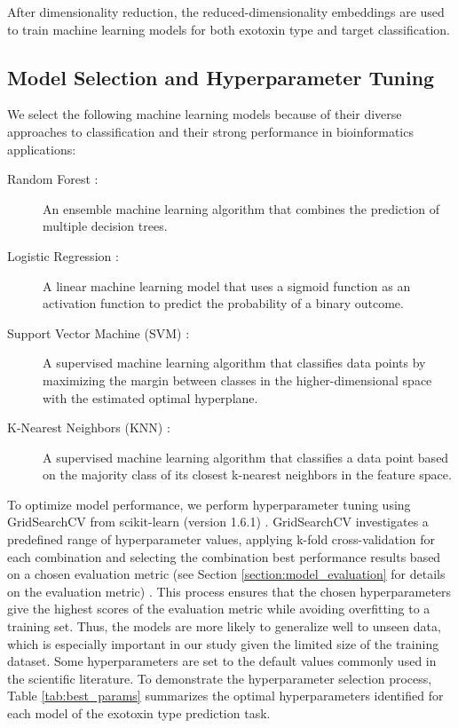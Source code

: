 After dimensionality reduction, the reduced-dimensionality embeddings are used to train machine learning models for both exotoxin type and target classification.

\subsection{Model Selection and Hyperparameter Tuning}
We select the following machine learning models because of their diverse approaches to classification and their strong performance in bioinformatics applications:

\begin{description}
	\item[Random Forest  \cite{Breiman2001}:] An ensemble machine learning algorithm that combines the prediction of multiple decision trees.
	\item[Logistic Regression  \cite{Cox1958}:] A linear machine learning model that uses a sigmoid function as an activation function to predict the probability of a binary outcome.
	\item[Support Vector Machine (SVM)  \cite{Cortes1995}:] A supervised machine learning algorithm that classifies data points by maximizing the margin between classes in the higher-dimensional space with the estimated optimal hyperplane.
	\item[K-Nearest Neighbors (KNN)  \cite{Guo2003}:] A supervised machine learning algorithm that classifies a data point based on the majority class of its closest k-nearest neighbors in the feature space.
\end{description}

To optimize model performance, we perform hyperparameter tuning using GridSearchCV from scikit-learn (version 1.6.1) \cite{pedregosa2011scikit}.
GridSearchCV investigates a predefined range of hyperparameter values, applying k-fold cross-validation for each combination and selecting the combination best performance results based on a chosen evaluation metric (see Section \ref{section:model_evaluation} for details on the evaluation metric) \cite{liashchynskyi2019gridsearchrandomsearch}.  
This process ensures that the chosen hyperparameters give the highest scores of the evaluation metric while avoiding overfitting to a training set.
Thus, the models are more likely to generalize well to unseen data, which is especially important in our study given the limited size of the training dataset.
Some hyperparameters are set to the default values commonly used in the scientific literature.
To demonstrate the hyperparameter selection process, Table \ref{tab:best_params} summarizes the optimal hyperparameters identified for each model of the exotoxin type prediction task.

